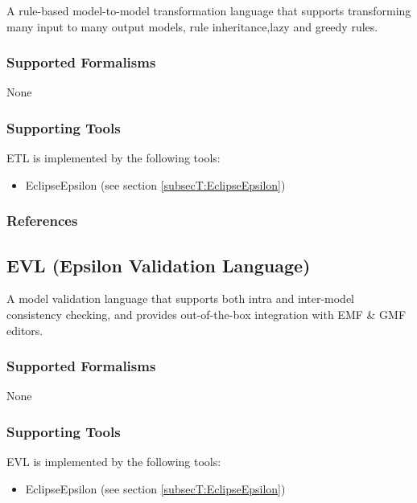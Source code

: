 A rule-based model-to-model transformation language that supports transforming many input to many output models, rule inheritance,lazy and greedy rules.

\subsubsection{Supported Formalisms}

None


\subsubsection{Supporting Tools}

ETL is implemented by the following tools:
\begin{itemize}
	\item EclipseEpsilon (see section \ref{subsecT:EclipseEpsilon})
\end{itemize}


\subsubsection{References}





\subsection{EVL (Epsilon Validation Language)}
\label{subsecL:EVL}


A model validation language that supports both intra and inter-model consistency checking, and provides out-of-the-box integration with EMF \& GMF editors.

\subsubsection{Supported Formalisms}

None


\subsubsection{Supporting Tools}

EVL is implemented by the following tools:
\begin{itemize}
	\item EclipseEpsilon (see section \ref{subsecT:EclipseEpsilon})
\end{itemize}



